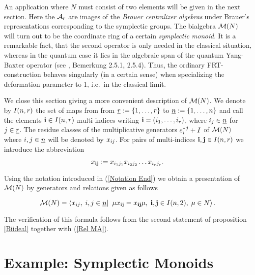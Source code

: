 \documentclass[twoside,12pt]{article}
\begin{document}
An application where $N$ must consist of two elements will be given in
the next section. Here the ${\cal A}_r$ are images of the {\em Brauer
  centralizer algebras} under Brauer's representations corresponding
to the symplectic groups. The bialgebra ${\cal M}(N)$ will turn out to be
the coordinate ring of a certain {\em symplectic monoid}.
It is a remarkable fact, that the second operator is only needed
in the classical situation, whereas in the quantum case it lies in the
algebraic span of the quantum Yang-Baxter operator (see \cite{doc},
Bemerkung 2.5.1, 2.5.4). Thus, the ordinary FRT-construction behaves
singularly (in a certain sense) when specializing the deformation parameter
to 1, i.e.\ in the classical limit.\Ab

We close this section giving a more convenient description of ${\cal M}(N)$. We denote by
$I(n,r)$ the set of maps from 
from $\underline{r}:=\{1, \ldots , r\}$ to
$\underline{n}:=\{1, \ldots , n\}$ and call the elements 
${\bf i} \in I(n,r)$ multi-indices writing ${\bf i}=(i_1, \ldots ,
i_r)$, where $i_j\in \underline{n}$ for $j\in \underline{r}$. The residue classes
of the multiplicative
generators ${{e}^*_{i}}^{j} +I$ of ${\cal M}(N)$ where $i,j\in \underline{n}$ will be
denoted by $x_{i j}$. For pairs of multi-indices ${\bf i},{\bf j}\in
I(n,r)$ we introduce the abbreviation

\[ x_{{\bf i} {\bf j}}:=x_{i_1 j_1}x_{i_2 j_2}\ldots
x_{i_r j_r}. \]

Using the notation introduced in (\ref{Notation End}) we obtain
a presentation of ${\cal M}(N)$ by generators and relations given as
follows

\begin{equation} \label{frt konkret}
{\cal M}(N)=\left< x_{i j}, \; i,j\in \underline{n}|\;\; \mu x_{{\bf i} {\bf j}}=x_{{\bf i} {\bf j}}\mu,\; {\bf i}, {\bf j} \in I(n,2),\;
  \mu\in N\right>. 
\end{equation}

The verification of this formula follows from the second statement of
proposition \ref{Biideal} together with (\ref{Rel MA}).
  













\section{Example: Symplectic Monoids}
\end{document}
